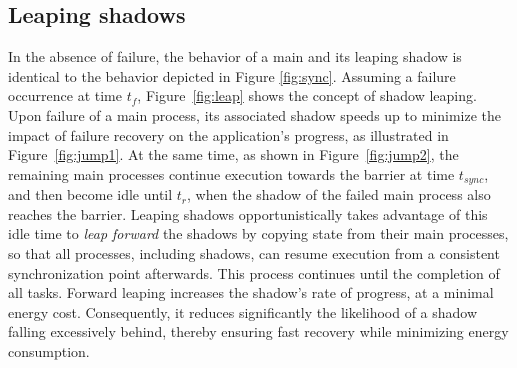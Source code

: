 \subsection {Leaping shadows}
\label{sec:leaping_shadows}

In the absence of failure, the behavior of a main  and its leaping shadow is identical to the behavior depicted in Figure \ref{fig:sync}. Assuming a failure occurrence at time $t_f$, Figure~\ref{fig:leap} shows the concept of shadow leaping. 
Upon failure of a main process, its associated shadow speeds up to minimize the impact of failure recovery on the application's progress, as illustrated in Figure~\ref{fig:jump1}. 
At the same time, as shown in Figure~\ref{fig:jump2}, the remaining main processes continue execution towards the barrier at time $t_{sync}$, and then become idle until $t_r$, when the shadow of the failed main process also reaches the barrier. %
Leaping shadows opportunistically takes advantage of this idle time to {\it leap forward} the shadows by copying state from their main processes, so that  
all processes, including shadows, can resume execution from a consistent synchronization point afterwards. This process continues until the completion of all tasks. Forward leaping increases the shadow's rate of progress, at a minimal energy cost. Consequently, it reduces significantly the likelihood of a shadow falling excessively behind, thereby ensuring fast recovery while minimizing energy consumption.




